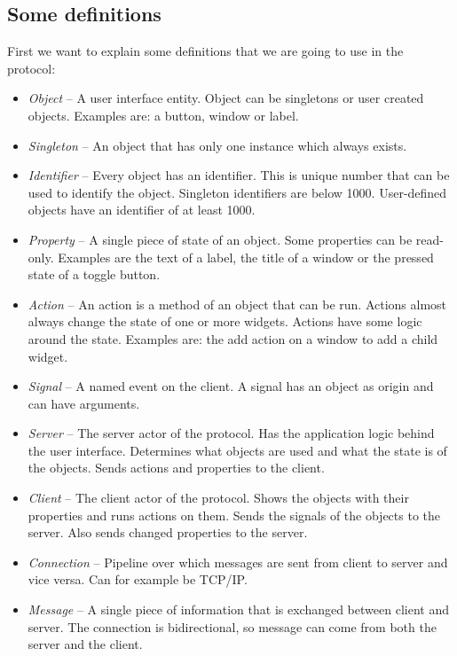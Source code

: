 \documentclass[11pt,a4paper]{article}
\begin{document}
\subsection{Some definitions}

First we want to explain some definitions that we are going to use in the protocol:

\begin{itemize}
\item \textit{Object} -- A user interface entity. Object can be singletons or user created objects. Examples are: a button, window or label.
\item \textit{Singleton} -- An object that has only one instance which always exists.
\item \textit{Identifier} -- Every object has an identifier.
This is unique number that can be used to identify the object.
Singleton identifiers are below 1000.
User-defined objects have an identifier of at least 1000.
\item \textit{Property} -- A single piece of state of an object. Some properties can be read-only.
Examples are the text of a label, the title of a window or the pressed state of a toggle button.
\item \textit{Action} -- An action is a method of an object that can be run.
Actions almost always change the state of one or more widgets.
Actions have some logic around the state.
Examples are: the add action on a window to add a child widget.
\item \textit{Signal} -- A named event on the client.
A signal has an object as origin and can have arguments.
\item \textit{Server} -- The server actor of the protocol.
Has the application logic behind the user interface.
Determines what objects are used and what the state is of the objects.
Sends actions and properties to the client.
\item \textit{Client} -- The client actor of the protocol.
Shows the objects with their properties and runs actions on them.
Sends the signals of the objects to the server.
Also sends changed properties to the server.
\item \textit{Connection} -- Pipeline over which messages are sent from client to server and vice versa.
Can for example be TCP/IP.
\item \textit{Message} -- A single piece of information that is exchanged between client and server.
The connection is bidirectional, so message can come from both the server and the client.
\end{itemize}
\end{document}
